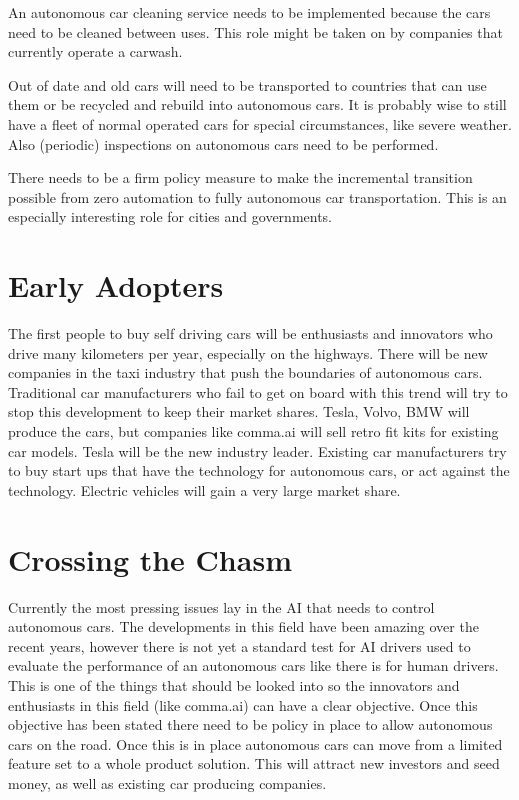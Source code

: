 \documentclass[a4paper]{article}
\begin{document}
An autonomous car cleaning service needs to be implemented because the cars need to be cleaned between uses. This role might be taken on by companies that currently operate a carwash.

Out of date and old cars will need to be transported to countries that can use them or be recycled and rebuild into autonomous cars. It is probably wise to still have a fleet of normal operated cars for special circumstances, like severe weather. Also (periodic) inspections on autonomous cars need to be performed. 

There needs to be a firm policy measure to make the incremental transition possible from zero automation to fully autonomous car transportation. This is an especially interesting role for cities and governments.

\section{Early Adopters}
\label{sec:early-adopters}

The first people to buy self driving cars will be enthusiasts and innovators who drive many kilometers per year, especially on the highways. There will be new companies in the taxi industry that push the boundaries of autonomous cars.
Traditional car manufacturers who fail to get on board with this trend will try to stop this development to keep their market shares.
Tesla, Volvo, BMW will produce the cars, but companies like comma.ai will sell retro fit kits for existing car models.
Tesla will be the new industry leader.
Existing car manufacturers try to buy start ups that have the technology for autonomous cars, or act against the technology.
Electric vehicles will gain a very large market share.

\section{Crossing the Chasm}
\label{sec:crossing-the-chasm}

Currently the most pressing issues lay in the AI that needs to control autonomous cars. The developments in this field have been amazing over the recent years, however there is not yet a standard test for AI drivers used to evaluate the performance of an autonomous cars like there is for human drivers. This is one of the things that should be looked into so the innovators and enthusiasts in this field (like comma.ai) can have a clear objective.
Once this objective has been stated there need to be policy in place to allow autonomous cars on the road. Once this is in place autonomous cars can move from a limited feature set to a whole product solution. This will attract new investors and seed money, as well as existing car producing companies.



\end{document}
